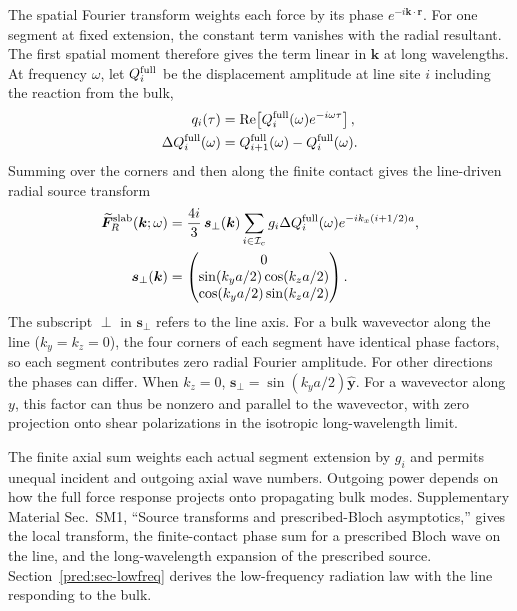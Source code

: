 \documentclass[10pt,aps,onecolumn,floatfix,notitlepage,nofootinbib,showkeys]{revtex4-2}
\newcommand{\vk}{\bm{k}}
\newcommand{\vF}{\bm{F}}
\newcommand{\vrr}{\bm{r}}
\newcommand{\ey}{\hat{\bm{y}}}
\newcommand{\Ic}{\mathcal I_c}
\begin{document}
The spatial Fourier transform weights each force by its phase $e^{-i\vk\cdot\vrr}$. For one segment at fixed extension, the constant term vanishes with the radial resultant. The first spatial moment therefore gives the term linear in $\vk$ at long wavelengths. At frequency $\omega$, let $Q_i^{\rm full}$ be the displacement amplitude at line site $i$ including the reaction from the bulk,
\begin{align}
 q_i(\tau)&=\operatorname{Re}\!\left[Q_i^{\rm full}(\omega)e^{-i\omega\tau}\right],\\
 \Delta Q_i^{\rm full}(\omega)&=Q_{i+1}^{\rm full}(\omega)-Q_i^{\rm full}(\omega).
 \label{eq:s3-fixed-frequency-phasor}
\end{align}
Summing over the corners and then along the finite contact gives the line-driven radial source transform
\begin{align}
  \widetilde{\vF}^{\rm slab}_{R}(\vk;\omega)
  &=\frac{4i}{3}\,\bm s_\perp(\vk)
  \sum_{i\in\Ic}g_i\Delta Q_i^{\rm full}(\omega)
  e^{-ik_x(i+1/2)a},\\
  \bm s_\perp(\vk)
  &=\begin{pmatrix}
    0\\
    \sin(k_ya/2)\cos(k_za/2)\\
    \cos(k_ya/2)\sin(k_za/2)
  \end{pmatrix}.
  \label{eq:s3-general-slab-source}
\end{align}
The subscript $\perp$ in $\bm s_\perp$ refers to the line axis. For a bulk wavevector along the line ($k_y=k_z=0$), the four corners of each segment have identical phase factors, so each segment contributes zero radial Fourier amplitude. For other directions the phases can differ. When $k_z=0$, $\bm s_\perp=\sin(k_y a/2)\ey$. For a wavevector along $y$, this factor can thus be nonzero and parallel to the wavevector, with zero projection onto shear polarizations in the isotropic long-wavelength limit.

The finite axial sum weights each actual segment extension by $g_i$ and permits unequal incident and outgoing axial wave numbers. Outgoing power depends on how the full force response projects onto propagating bulk modes. Supplementary Material Sec.~SM1, ``Source transforms and prescribed-Bloch asymptotics,'' gives the local transform, the finite-contact phase sum for a prescribed Bloch wave on the line, and the long-wavelength expansion of the prescribed source. Section~\ref{pred:sec-lowfreq} derives the low-frequency radiation law with the line responding to the bulk.
\end{document}
